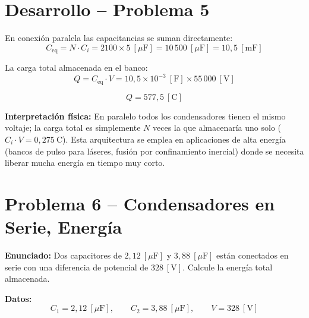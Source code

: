 \documentclass[12pt,letterpaper]{article}
\begin{document}
\section*{Desarrollo -- Problema 5}

En conexi\'on paralela las capacitancias se suman directamente:
\[
    C_{\text{eq}} = N\cdot C_i = 2100\times 5\ [\mu\text{F}] = 10\,500\ [\mu\text{F}] = 10{,}5\ [\text{mF}]
\]

La carga total almacenada en el banco:
\[
    Q = C_{\text{eq}}\cdot V = 10{,}5\times10^{-3}\ [\text{F}]\times 55\,000\ [\text{V}]
\]

\[
    \boxed{Q = 577{,}5\ [\text{C}]}
\]

\noindent\textbf{Interpretaci\'on f\'isica:} En paralelo todos los condensadores tienen el mismo voltaje; la carga total es simplemente $N$ veces la que almacenar\'ia uno solo ($C_i\cdot V = 0{,}275\ \text{C}$). Esta arquitectura se emplea en aplicaciones de alta energ\'ia (bancos de pulso para l\'aseres, fusión por confinamiento inercial) donde se necesita liberar mucha energ\'ia en tiempo muy corto.

\newpage

\section*{Problema 6 -- Condensadores en Serie, Energ\'ia}

\noindent\textbf{Enunciado:} Dos capacitores de $2{,}12\ [\mu\text{F}]$ y $3{,}88\ [\mu\text{F}]$ est\'an conectados en serie con una diferencia de potencial de $328\ [\text{V}]$. Calcule la energ\'ia total almacenada.

\medskip
\noindent\textbf{Datos:}
\[
    C_1 = 2{,}12\ [\mu\text{F}],\qquad C_2 = 3{,}88\ [\mu\text{F}],\qquad V = 328\ [\text{V}]
\]

\begin{center}
\end{center}
\end{document}

